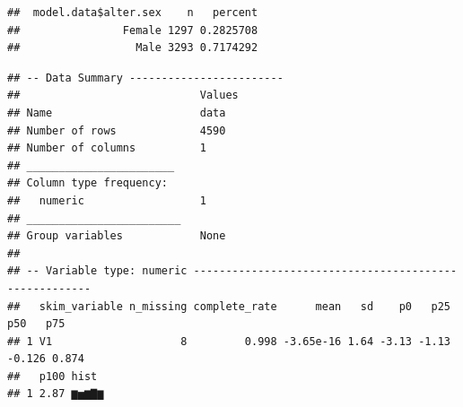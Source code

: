 \documentclass[
]{book}
\newenvironment{Shaded}{\begin{snugshade}}{\end{snugshade}}
\newcommand{\CommentTok}[1]{\textcolor[rgb]{0.56,0.35,0.01}{\textit{#1}}}
\newcommand{\DocumentationTok}[1]{\textcolor[rgb]{0.56,0.35,0.01}{\textbf{\textit{#1}}}}
\newcommand{\FunctionTok}[1]{\textcolor[rgb]{0.00,0.00,0.00}{#1}}
\newcommand{\NormalTok}[1]{#1}
\newcommand{\SpecialCharTok}[1]{\textcolor[rgb]{0.00,0.00,0.00}{#1}}
\begin{document}
\begin{Shaded}
\end{Shaded}

\begin{verbatim}
##  model.data$alter.sex    n   percent
##                Female 1297 0.2825708
##                  Male 3293 0.7174292
\end{verbatim}

\begin{Shaded}
\end{Shaded}

\begin{verbatim}
## -- Data Summary ------------------------
##                            Values
## Name                       data  
## Number of rows             4590  
## Number of columns          1     
## _______________________          
## Column type frequency:           
##   numeric                  1     
## ________________________         
## Group variables            None  
## 
## -- Variable type: numeric ------------------------------------------------------
##   skim_variable n_missing complete_rate      mean   sd    p0   p25    p50   p75
## 1 V1                    8         0.998 -3.65e-16 1.64 -3.13 -1.13 -0.126 0.874
##   p100 hist 
## 1 2.87 ▆▅▆▇▆
\end{verbatim}
\end{document}
